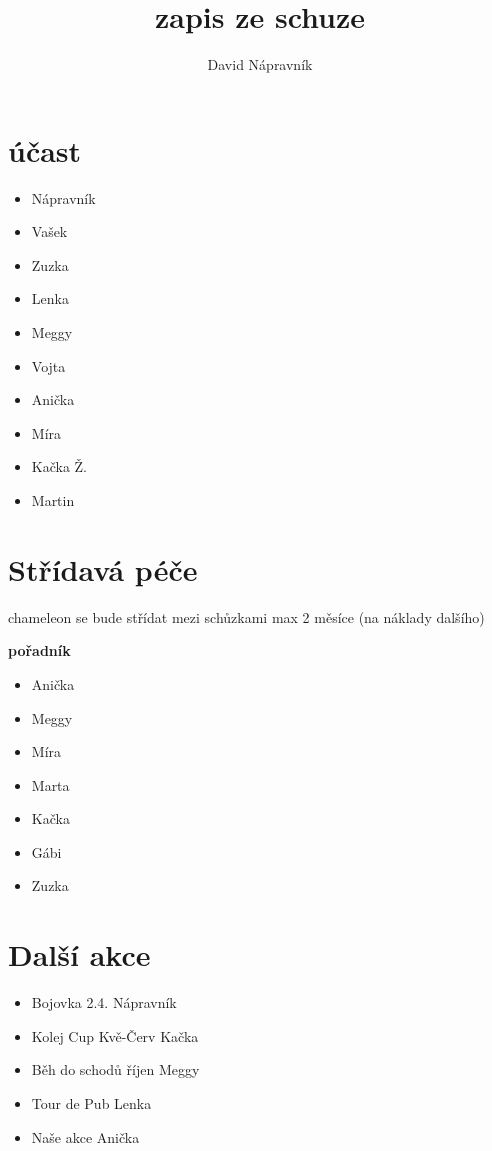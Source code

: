 \documentclass[10pt,a4paper]{article}
\author{David Nápravník}
\begin{document}
\title{ zapis ze schuze}

\maketitle

\section*{účast}
\begin{multicols}{3}
\begin{itemize}
\item Nápravník
\item Vašek
\item Zuzka
\item Lenka
\item Meggy
\item Vojta
\item Anička
\item Míra
\item Kačka Ž.
\item Martin
\end{itemize}
\end{multicols}

\section{Střídavá péče}
chameleon se bude střídat mezi schůzkami
max 2 měsíce (na náklady dalšího)

\textbf{pořadník}
\begin{multicols}{3}
\begin{itemize}
\item Anička
\item Meggy
\item Míra
\item Marta
\item Kačka
\item Gábi
\item Zuzka
\end{itemize}
\end{multicols}


\section{Další akce}
\begin{itemize}
\item Bojovka 2.4. Nápravník
\item Kolej Cup Kvě-Červ Kačka
\item Běh do schodů říjen Meggy
\item Tour de Pub Lenka
\item Naše akce Anička
\end{itemize}
\end{document}
